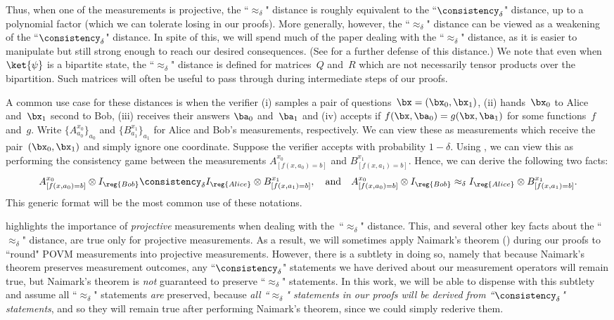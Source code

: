 Thus, when one of the measurements is projective,
the ``$\approx_\delta$" distance is roughly equivalent to the ``$\consistency_\delta$" distance,
up to a polynomial factor (which we can tolerate losing in our proofs).
More generally, however, the ``$\approx_\delta$" distance
can be viewed as a weakening of the ``$\consistency_\delta$" distance.
In spite of this, we will spend much of the paper dealing with the ``$\approx_\delta$" distance,
as it is easier to manipulate but still strong enough to reach our desired consequences.
(See \cite[Section~$2.3.1$]{Vid11} for a further defense of this distance.)
We note that even when~$\ket{\psi}$ is a bipartite state,
the ``$\approx_\delta$" distance is defined for matrices~$Q$ and~$R$
which are not necessarily tensor products over the bipartition.
Such matrices will often be useful to pass through during intermediate steps of our proofs.

A common use case for these distances is when the verifier (i) samples a pair of questions~$\bx = (\bx_0, \bx_1)$,
(ii) hands~$\bx_0$ to Alice and~$\bx_1$ second to Bob,
(iii) receives their answers $\ba_0$ and~$\ba_1$
and (iv) accepts if $f(\bx, \ba_0) = g(\bx, \ba_1)$ for some functions~$f$ and~$g$.
Write $\{A^{x_0}_{a_0}\}_{a_0}$ and $\{B^{x_1}_{a_1}\}_{a_1}$ for Alice and Bob's measurements, respectively.
We can view these as measurements which receive the pair~$(\bx_0, \bx_1)$ and simply ignore one coordinate.
Suppose the verifier accepts with probability $1-\delta$.
Using , we can view this as performing the consistency game
between the measurements $A^{x_0}_{[f(x, a_0) = b]}$ and  $B^{x_1}_{[f(x, a_1) = b]}$.
Hence, we can derive the following two facts:
\begin{equation*}
A^{x_0}_{[f(x, a_0) = b]} \otimes I_{\reg{Bob}}
\consistency_{\delta} I_{\reg{Alice}} \otimes B^{x_1}_{[f(x, a_1) = b]},
\quad
\text{and}
\quad
A^{x_0}_{[f(x, a_0) = b]} \otimes I_{\reg{Bob}}
\approx_{\delta} I_{\reg{Alice}} \otimes B^{x_1}_{[f(x, a_1) = b]}.
\end{equation*}
This generic format will be the most common use of these notations.

 highlights the importance of \emph{projective} measurements when dealing with the~``$\approx_\delta$" distance.
This, and several other key facts about the ``$\approx_\delta$" distance, are true only for projective measurements.
As a result, we will sometimes apply Naimark's theorem ()
during our proofs to ``round" POVM measurements into projective measurements.
However, there is a subtlety in doing so, namely that 
because Naimark's theorem preserves measurement outcomes,
any ``$\consistency_\delta$" statements we have derived about our measurement operators will remain true,
but Naimark's theorem is \emph{not} guaranteed to preserve ``$\approx_\delta$" statements.
In this work, we will be able to dispense with this subtlety and assume all ``$\approx_\delta$" statements \emph{are} preserved,
because \emph{all ``$\approx_\delta$" statements in our proofs will be derived from ``$\consistency_\delta$" statements},
and so they will remain true after performing Naimark's theorem, since we could simply rederive them.

